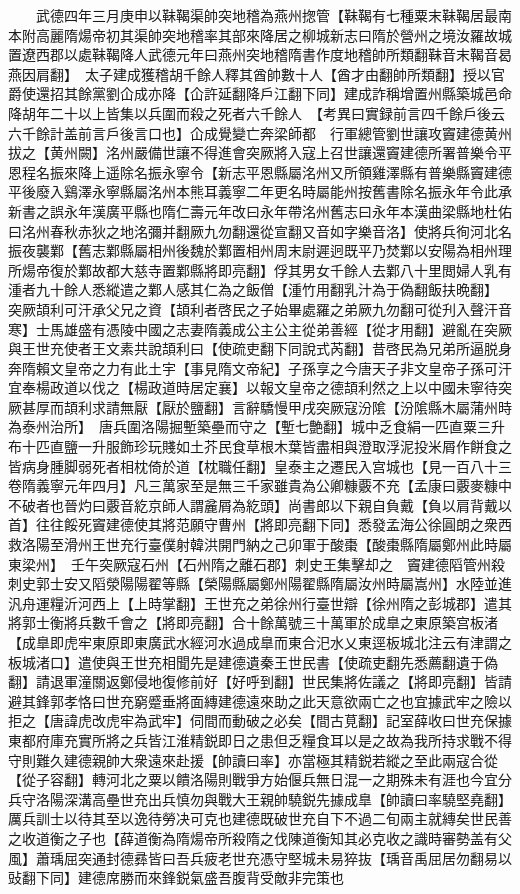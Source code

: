 　　武德四年三月庚申以靺鞨渠帥突地稽為燕州揔管【靺鞨有七種粟末靺鞨居最南本附高麗隋煬帝初其渠帥突地稽率其部來降居之柳城新志曰隋於營州之境汝羅故城置遼西郡以處靺鞨降人武德元年曰燕州突地稽隋書作度地稽帥所類翻靺音末鞨音曷燕因肩翻】　太子建成獲稽胡千餘人釋其酋帥數十人【酋才由翻帥所類翻】授以官爵使還招其餘黨劉仚成亦降【仚許延翻降戶江翻下同】建成詐稱增置州縣築城邑命降胡年二十以上皆集以兵圍而殺之死者六千餘人　【考異曰實録前言四千餘戶後云六千餘計盖前言戶後言口也】仚成覺變亡奔梁師都　行軍總管劉世讓攻竇建德黄州拔之【黄州闕】洺州嚴備世讓不得進會突厥將入寇上召世讓還竇建德所署普樂令平恩程名振來降上遥除名振永寧令【新志平恩縣屬洺州又所領雞澤縣有普樂縣竇建德平後廢入鷄澤永寧縣屬洺州本熊耳義寧二年更名時屬能州按舊書除名振永年令此承新書之誤永年漢廣平縣也隋仁壽元年改曰永年帶洺州舊志曰永年本漢曲梁縣地杜佑曰洺州春秋赤狄之地洺彌并翻厥九勿翻還從宣翻又音如字樂音洛】使將兵徇河北名振夜襲鄴【舊志鄴縣屬相州後魏於鄴置相州周末尉遲迥既平乃焚鄴以安陽為相州理所煬帝復於鄴故都大慈寺置鄴縣將即亮翻】俘其男女千餘人去鄴八十里閲婦人乳有湩者九十餘人悉縱遣之鄴人感其仁為之飯僧【湩竹用翻乳汁為于偽翻飯扶晩翻】　突厥頡利可汗承父兄之資【頡利者啓民之子始畢處羅之弟厥九勿翻可從刋入聲汗音寒】士馬雄盛有憑陵中國之志妻隋義成公主公主從弟善經【從才用翻】避亂在突厥與王世充使者王文素共說頡利曰【使疏吏翻下同說式芮翻】昔啓民為兄弟所逼脱身奔隋賴文皇帝之力有此土宇【事見隋文帝紀】子孫享之今唐天子非文皇帝子孫可汗宜奉楊政道以伐之【楊政道時居定襄】以報文皇帝之德頡利然之上以中國未寧待突厥甚厚而頡利求請無厭【厭於鹽翻】言辭驕慢甲戌突厥寇汾隂【汾隂縣木屬蒲州時為泰州治所】　唐兵圍洛陽掘塹築壘而守之【塹七艶翻】城中乏食絹一匹直粟三升布十匹直鹽一升服飾珍玩賤如土芥民食草根木葉皆盡相與澄取浮泥投米屑作餅食之皆病身腫脚弱死者相枕倚於道【枕職任翻】皇泰主之遷民入宫城也【見一百八十三卷隋義寧元年四月】凡三萬家至是無三千家雖貴為公卿糠覈不充【孟康曰覈麥糠中不破者也晉灼曰覈音紇京師人謂麄屑為紇頭】尚書郎以下親自負戴【負以肩背戴以首】往往餒死竇建德使其將范願守曹州【將即亮翻下同】悉發孟海公徐圓朗之衆西救洛陽至滑州王世充行臺僕射韓洪開門納之己卯軍于酸棗【酸棗縣隋屬鄭州此時屬東梁州】　壬午突厥寇石州【石州隋之離石郡】刺史王集擊却之　竇建德䧟管州殺刺史郭士安又䧟滎陽陽翟等縣【榮陽縣屬鄭州陽翟縣隋屬汝州時屬嵩州】水陸並進汎舟運糧沂河西上【上時掌翻】王世充之弟徐州行臺世辯【徐州隋之彭城郡】遣其將郭士衡將兵數千會之【將即亮翻】合十餘萬號三十萬軍於成臯之東原築宫板渚【成臯即虎牢東原即東廣武水經河水過成臯而東合汜水乂東逕板城北注云有津謂之板城渚口】遣使與王世充相聞先是建德遺秦王世民書【使疏吏翻先悉薦翻遺于偽翻】請退軍潼關返鄭侵地復修前好【好呼到翻】世民集將佐議之【將即亮翻】皆請避其鋒郭孝恪曰世充窮蹙垂將面縳建德遠來助之此天意欲兩亡之也宜據武牢之險以拒之【唐諱虎改虎牢為武牢】伺間而動破之必矣【間古莧翻】記室薛收曰世充保據東都府庫充實所將之兵皆江淮精鋭即日之患但乏糧食耳以是之故為我所持求戰不得守則難久建德親帥大衆遠來赴援【帥讀曰率】亦當極其精鋭若縱之至此兩寇合從【從子容翻】轉河北之粟以饋洛陽則戰爭方始偃兵無日混一之期殊未有涯也今宜分兵守洛陽深溝高壘世充出兵慎勿與戰大王親帥驍鋭先據成臯【帥讀曰率驍堅堯翻】厲兵訓士以待其至以逸待勞决可克也建德既破世充自下不過二旬兩主就縳矣世民善之收道衡之子也【薛道衡為隋煬帝所殺隋之伐陳道衡知其必克收之識時審勢盖有父風】蕭瑀屈突通封德彞皆曰吾兵疲老世充憑守堅城未易猝抜【瑀音禹屈居勿翻易以䜴翻下同】建德席勝而來鋒鋭氣盛吾腹背受敵非完策也